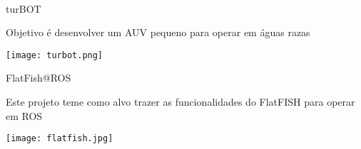 
\begin{frame}[c]{} 
    \framesubtitle{}
    \transdissolve[duration=0.5]
   
    \begin{center}
    \end{center}

\end{frame}






\begin{frame}[t]{turBOT}

    Objetivo é desenvolver um AUV pequeno para operar em águas razas
    \begin{center}

    \texttt{[image: turbot.png]}

    \end{center}
    
    
            
\end{frame}




\begin{frame}[t]{FlatFish@ROS}

    
    Este projeto teme como alvo trazer as funcionalidades do FlatFISH para operar em ROS
    \begin{center}

    \texttt{[image: flatfish.jpg]}

    \end{center}
    
    
            
\end{frame}


